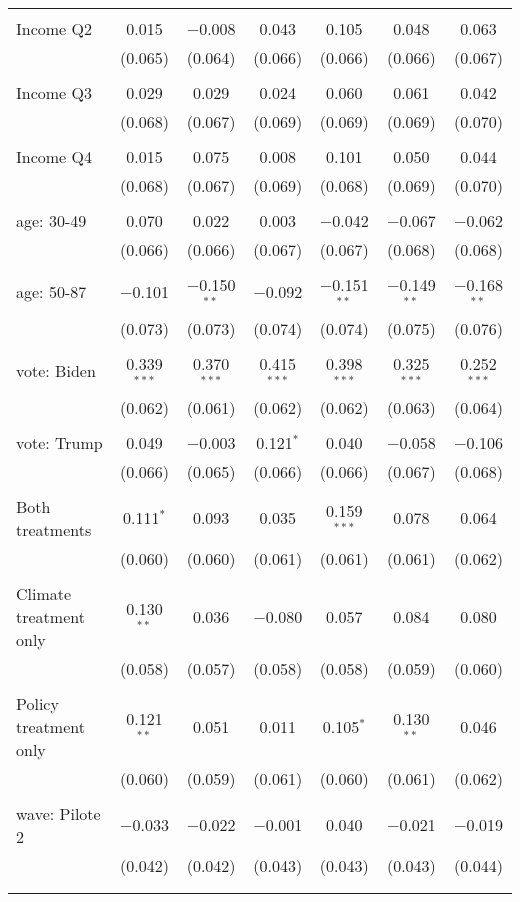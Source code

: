 \begin{tabular}{@{\extracolsep{5pt}}lcccccc}
  & & & & & & \\ 
 Income Q2 & 0.015 & $-$0.008 & 0.043 & 0.105 & 0.048 & 0.063 \\ 
  & (0.065) & (0.064) & (0.066) & (0.066) & (0.066) & (0.067) \\ 
  & & & & & & \\ 
 Income Q3 & 0.029 & 0.029 & 0.024 & 0.060 & 0.061 & 0.042 \\ 
  & (0.068) & (0.067) & (0.069) & (0.069) & (0.069) & (0.070) \\ 
  & & & & & & \\ 
 Income Q4 & 0.015 & 0.075 & 0.008 & 0.101 & 0.050 & 0.044 \\ 
  & (0.068) & (0.067) & (0.069) & (0.068) & (0.069) & (0.070) \\ 
  & & & & & & \\ 
 age: 30-49 & 0.070 & 0.022 & 0.003 & $-$0.042 & $-$0.067 & $-$0.062 \\ 
  & (0.066) & (0.066) & (0.067) & (0.067) & (0.068) & (0.068) \\ 
  & & & & & & \\ 
 age: 50-87 & $-$0.101 & $-$0.150$^{**}$ & $-$0.092 & $-$0.151$^{**}$ & $-$0.149$^{**}$ & $-$0.168$^{**}$ \\ 
  & (0.073) & (0.073) & (0.074) & (0.074) & (0.075) & (0.076) \\ 
  & & & & & & \\ 
 vote: Biden & 0.339$^{***}$ & 0.370$^{***}$ & 0.415$^{***}$ & 0.398$^{***}$ & 0.325$^{***}$ & 0.252$^{***}$ \\ 
  & (0.062) & (0.061) & (0.062) & (0.062) & (0.063) & (0.064) \\ 
  & & & & & & \\ 
 vote: Trump & 0.049 & $-$0.003 & 0.121$^{*}$ & 0.040 & $-$0.058 & $-$0.106 \\ 
  & (0.066) & (0.065) & (0.066) & (0.066) & (0.067) & (0.068) \\ 
  & & & & & & \\ 
 Both treatments & 0.111$^{*}$ & 0.093 & 0.035 & 0.159$^{***}$ & 0.078 & 0.064 \\ 
  & (0.060) & (0.060) & (0.061) & (0.061) & (0.061) & (0.062) \\ 
  & & & & & & \\ 
 Climate treatment only & 0.130$^{**}$ & 0.036 & $-$0.080 & 0.057 & 0.084 & 0.080 \\ 
  & (0.058) & (0.057) & (0.058) & (0.058) & (0.059) & (0.060) \\ 
  & & & & & & \\ 
 Policy treatment only & 0.121$^{**}$ & 0.051 & 0.011 & 0.105$^{*}$ & 0.130$^{**}$ & 0.046 \\ 
  & (0.060) & (0.059) & (0.061) & (0.060) & (0.061) & (0.062) \\ 
  & & & & & & \\ 
 wave: Pilote 2 & $-$0.033 & $-$0.022 & $-$0.001 & 0.040 & $-$0.021 & $-$0.019 \\ 
  & (0.042) & (0.042) & (0.043) & (0.043) & (0.043) & (0.044) \\ 
  & & & & & & \\ 
\hline \\[-1.8ex] 


\end{tabular}
